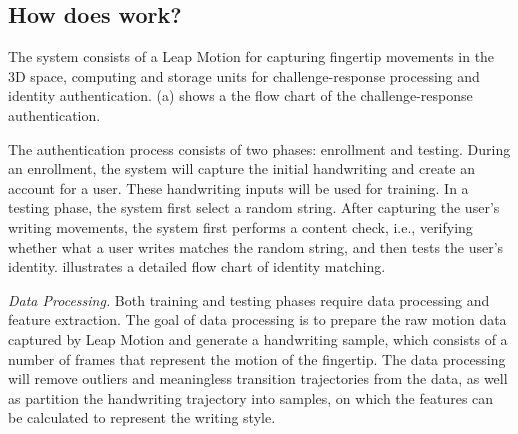 \subsection{{How does \CiT work?}}



The \CiT system consists of a Leap Motion for capturing fingertip movements in the 3D space, computing and storage units for challenge-response processing and identity authentication. (a) shows a the flow chart of the challenge-response authentication. 

The \CiT authentication process consists of two phases: enrollment and testing. During an enrollment, the system will capture the initial handwriting and create an account for a user. These handwriting inputs will be used for training. In a testing phase, the system first select a random string. After capturing the user's writing movements, the system first performs a content check, i.e., verifying whether what a user writes matches the random string, and then tests the user's identity.   illustrates a detailed flow chart of identity matching. 





\emph{Data Processing.} Both training and testing phases require data processing and feature extraction. The goal of data processing is to prepare the raw motion data captured by Leap Motion and generate a handwriting sample, which consists of a number of frames that represent the motion of the fingertip. 
The data processing will remove outliers and meaningless transition trajectories from the data,  as well as partition the handwriting trajectory into samples, on which the features can be calculated to represent the writing style. 



